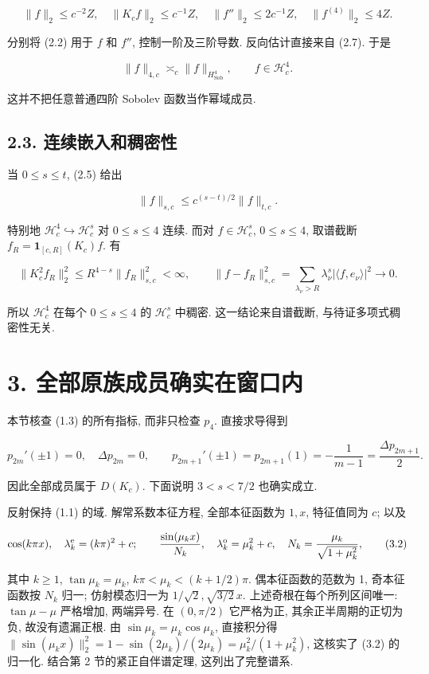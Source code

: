 \documentclass[UTF8,fontset=fandol,11pt,a4paper]{ctexart}
\begin{document}
\[
 \|f\|_2\le c^{-2}Z,\quad
 \|K_cf\|_2\le c^{-1}Z,\quad
 \|f''\|_2\le2c^{-1}Z,\quad
 \|f^{(4)}\|_2\le4Z.
 \tag{2.8}
\]


分别将 (2.2) 用于 \(f\) 和 \(f''\), 控制一阶及三阶导数. 反向估计直接来自 (2.7). 于是


\[
 \|f\|_{4,c}\asymp_c\|f\|_{H_{\mathrm{Sob}}^4},
 \qquad f\in\mathcal H_c^4.
 \tag{2.9}
\]


这并不把任意普通四阶 Sobolev 函数当作幂域成员.


\subsection*{2.3. 连续嵌入和稠密性}

当 \(0\le s\le t\), (2.5) 给出


\[
 \|f\|_{s,c}\le c^{(s-t)/2}\|f\|_{t,c}.
 \tag{2.10}
\]


特别地 \(\mathcal H_c^4\hookrightarrow\mathcal H_c^s\) 对 \(0\le s\le4\) 连续. 而对 \(f\in\mathcal H_c^s\), \(0\le s\le4\), 取谱截断 \(f_R=\mathbf1_{[c,R]}(K_c)f\). 有


\[
 \|K_c^2 f_R\|_2^2
 \le R^{4-s}\|f_R\|_{s,c}^2<\infty,\qquad
 \|f-f_R\|_{s,c}^2
 =\sum_{\lambda_\nu>R}\lambda_\nu^s|\langle f,e_\nu\rangle|^2\to0.
 \tag{2.11}
\]


所以 \(\mathcal H_c^4\) 在每个 \(0\le s\le4\) 的 \(\mathcal H_c^s\) 中稠密. 这一结论来自谱截断, 与待证多项式稠密性无关.


\section*{3. 全部原族成员确实在窗口内}

本节核查 (1.3) 的所有指标, 而非只检查 \(p_4\). 直接求导得到


\[
 p_{2m}'(\pm1)=0,\quad \Delta p_{2m}=0,\qquad
 p_{2m+1}'(\pm1)=p_{2m+1}(1)=-\frac1{m-1}
 =\frac{\Delta p_{2m+1}}2.
 \tag{3.1}
\]


因此全部成员属于 \(D(K_c)\). 下面说明 \(3<s<7/2\) 也确实成立.


反射保持 (1.1) 的域. 解常系数本征方程, 全部本征函数为 \(1,x\), 特征值同为 \(c\); 以及


\[
 \cos(k\pi x),\quad \lambda_k^{\rm e}=(k\pi)^2+c;\qquad
 \frac{\sin(\mu_kx)}{N_k},\quad \lambda_k^{\rm o}=\mu_k^2+c,
 \quad
 N_k=\frac{\mu_k}{\sqrt{1+\mu_k^2}},
 \tag{3.2}
\]


其中 \(k\ge1\), \(\tan\mu_k=\mu_k\), \(k\pi<\mu_k<(k+1/2)\pi\). 偶本征函数的范数为 1, 奇本征函数按 \(N_k\) 归一; 仿射模态归一为 \(1/\sqrt2,\sqrt{3/2}\,x\). 上述奇根在每个所列区间唯一: \(\tan\mu-\mu\) 严格增加, 两端异号. 在 \((0,\pi/2)\) 它严格为正, 其余正半周期的正切为负, 故没有遗漏正根. 由 \(\sin\mu_k=\mu_k\cos\mu_k\), 直接积分得 \(\|\sin(\mu_kx)\|_2^2=1-\sin(2\mu_k)/(2\mu_k)=\mu_k^2/(1+\mu_k^2)\), 这核实了 (3.2) 的归一化. 结合第 2 节的紧正自伴谱定理, 这列出了完整谱系.
\end{document}
